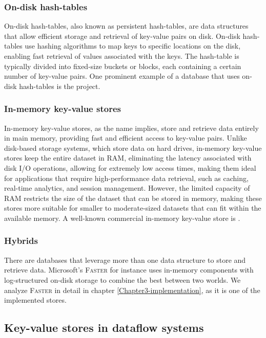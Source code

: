\subsubsection{On-disk hash-tables}

On-disk hash-tables, also known as persistent hash-tables, are data structures that allow efficient storage and retrieval of key-value pairs on disk. On-disk hash-tables use hashing algorithms to map keys to specific locations on the disk, enabling fast retrieval of values associated with the keys. The hash-table is typically divided into fixed-size buckets or blocks, each containing a certain number of key-value pairs. One prominent example of a database that uses on-disk hash-tables is the \cite{gdbm} project.

\subsubsection{In-memory key-value stores}

In-memory key-value stores, as the name implies, store and retrieve data entirely in main memory, providing fast and efficient access to key-value pairs. Unlike disk-based storage systems, which store data on hard drives, in-memory key-value stores keep the entire dataset in RAM, eliminating the latency associated with disk I/O operations, allowing for extremely low access times, making them ideal for applications that require high-performance data retrieval, such as caching, real-time analytics, and session management. However, the limited capacity of RAM restricts the size of the dataset that can be stored in memory, making these stores more suitable for smaller to moderate-sized datasets that can fit within the available memory. A well-known commercial in-memory key-value store is \cite{redis}.

\subsubsection{Hybrids}

There are databases that leverage more than one data structure to store and retrieve data. Microsoft's \textsc{Faster} \cite{faster} for instance uses in-memory components with log-structured on-disk storage to combine the best between two worlds. We analyze \textsc{Faster} in detail in chapter \ref{Chapter3-implementation}, as it is one of the implemented stores.

\subsection{Key-value stores in dataflow systems}

